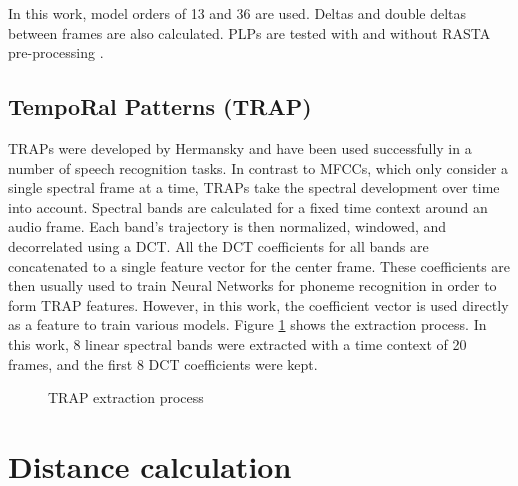  In this work, model orders of 13 and 36 are used. Deltas and double deltas between frames are also calculated. PLPs are tested with and without RASTA pre-processing \cite{rasta_plp}.


\subsection{TempoRal Patterns (TRAP)} 
TRAPs were developed by Hermansky \cite{traps1} \cite{traps2} and have been used successfully in a number of speech recognition tasks. In contrast to MFCCs, which only consider a single spectral frame at a time, TRAPs take the spectral development over time into account. Spectral bands are calculated for a fixed time context around an audio frame. Each band's trajectory is then normalized, windowed, and decorrelated using a DCT. All the DCT coefficients for all bands are concatenated to a single feature vector for the center frame. These coefficients are then usually used to train Neural Networks for phoneme recognition \cite{yan_barnard}\cite{matejka} in order to form TRAP features.  However, in this work, the coefficient vector is used directly as a feature to train various models. Figure \ref{fig:traps} shows the extraction process. In this work, 8 linear spectral bands were extracted with a time context of 20 frames, and the first 8 DCT coefficients were kept.
\begin{figure}
 \centerline{}
 \caption{TRAP extraction process \cite{jens}}
 \label{fig:traps}
\end{figure}


\section{Distance calculation}
